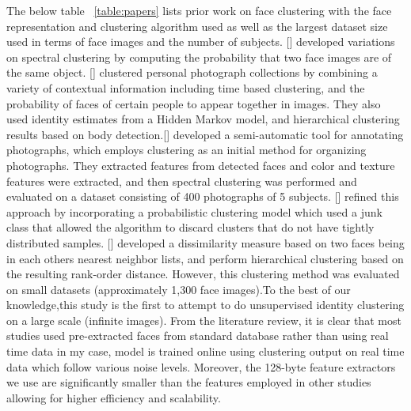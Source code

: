 \documentclass[a4paper,12pt, twoside]{NITKReport}
\begin{document}
\par The below table ~\ref{table:papers} lists prior work on face clustering with the face representation and clustering algorithm used as well as the largest dataset size used in terms of face images and the number of subjects. [\cite{ho2003clustering}] developed variations on spectral clustering by computing the probability that two face images are of the same object. [\cite{zhao2006automatic}] clustered personal photograph collections by combining a variety of contextual information including time based clustering, and the probability of faces of certain people to appear together in images. They also used identity estimates from a  Hidden  Markov  model,  and  hierarchical  clustering results based on body detection.[\cite{cui2007easyalbum}] developed a semi-automatic tool for annotating photographs,  which employs clustering as an initial method for organizing photographs. They extracted features from detected faces and color and texture features were extracted, and then spectral
clustering was performed and evaluated on a dataset consisting of 400 photographs of 5 subjects. [\cite{tian2007face}] refined this approach by incorporating a
probabilistic clustering model which used a junk class that allowed the algorithm to discard clusters that do not have tightly distributed samples. [\cite{zhu2011rank}] developed a dissimilarity measure based on two faces being in each others nearest neighbor lists, and perform hierarchical clustering based on the resulting rank-order distance.  However, this clustering method was evaluated on small datasets (approximately 1,300 face images).To the best of our knowledge,this study is the first to attempt to do unsupervised identity  clustering on a large scale (infinite images). From the literature review, it is  clear that most studies used pre-extracted faces from standard database rather than using real time data in my case, model is trained online using clustering output on real time data which follow various noise levels. Moreover, the 128-byte feature extractors we use are significantly smaller than the features employed  in  other  studies  allowing  for  higher  efficiency and scalability.
\end{document}
